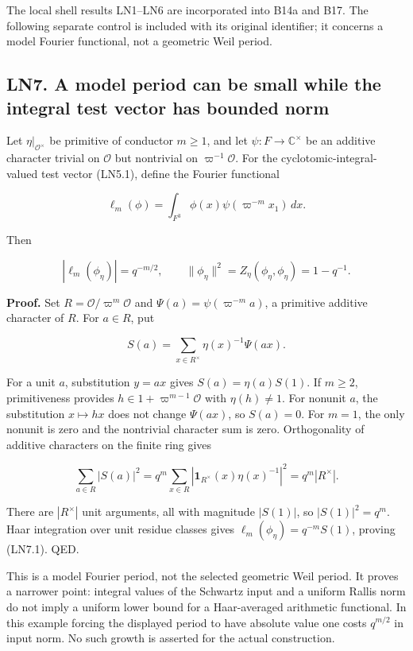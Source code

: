 \documentclass[11pt,a4paper]{article}
\theoremstyle{definition}
\begin{document}
The local shell results LN1--LN6 are incorporated into B14a and B17. The
following separate control is included with its original identifier; it
concerns a model Fourier functional, not a geometric Weil period.

\subsection{LN7. A model period can be small while the integral test
vector has bounded
norm}\label{ln7.-a-model-period-can-be-small-while-the-integral-test-vector-has-bounded-norm}

Let \(\eta|_{\mathcal O^\times}\) be primitive of conductor \(m\ge1\),
and let \(\psi:F\to\mathbb C^\times\) be an additive character trivial
on \(\mathcal O\) but nontrivial on \(\varpi^{-1}\mathcal O\). For the
cyclotomic-integral-valued test vector (LN5.1), define the Fourier
functional

\[
 \ell_m(\phi)=\int_{F^3}\phi(x)\psi(\varpi^{-m}x_1)\,dx.
\]

Then

\[
 |\ell_m(\phi_\eta)|=q^{-m/2},
 \qquad \|\phi_\eta\|^2=Z_\eta(\phi_\eta,\phi_\eta)=1-q^{-1}.
 \tag{LN7.1}
\]

\textbf{Proof.} Set \(R=\mathcal O/\varpi^m\mathcal O\) and
\(\Psi(a)=\psi(\varpi^{-m}a)\), a primitive additive character of \(R\).
For \(a\in R\), put

\[
 S(a)=\sum_{x\in R^\times}\eta(x)^{-1}\Psi(ax).
\]

For a unit \(a\), substitution \(y=ax\) gives \(S(a)=\eta(a)S(1)\). If
\(m\ge2\), primitiveness provides \(h\in1+\varpi^{m-1}\mathcal O\) with
\(\eta(h)\ne1\). For nonunit \(a\), the substitution \(x\mapsto hx\)
does not change \(\Psi(ax)\), so \(S(a)=0\). For \(m=1\), the only
nonunit is zero and the nontrivial character sum is zero. Orthogonality
of additive characters on the finite ring gives

\[
 \sum_{a\in R}|S(a)|^2
 =q^m\sum_{x\in R}|\mathbf1_{R^\times}(x)\eta(x)^{-1}|^2
 =q^m|R^\times|.
\]

There are \(|R^\times|\) unit arguments, all with magnitude \(|S(1)|\),
so \(|S(1)|^2=q^m\). Haar integration over unit residue classes gives
\(\ell_m(\phi_\eta)=q^{-m}S(1)\), proving (LN7.1). QED.

This is a model Fourier period, not the selected geometric Weil period.
It proves a narrower point: integral values of the Schwartz input and a
uniform Rallis norm do not imply a uniform lower bound for a
Haar-averaged arithmetic functional. In this example forcing the
displayed period to have absolute value one costs \(q^{m/2}\) in input
norm. No such growth is asserted for the actual construction.
\end{document}
